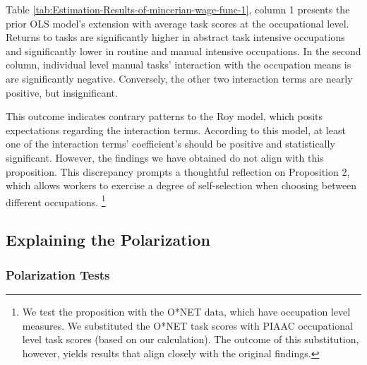 \vspace{-1cm}

\begin{onehalfspace}
Table \ref{tab:Estimation-Results-of-mincerian-wage-func-1}, column
1 presents the prior OLS model's extension with average task scores
at the occupational level. Returns to tasks are significantly higher
in abstract task intensive occupations and significantly lower in
routine and manual intensive occupations. In the second column, individual
level manual tasks' interaction with the occupation means is are significantly
negative. Conversely, the other two interaction terms are nearly positive,
but insignificant. 

This outcome indicates contrary patterns to the Roy model, which posits
expectations regarding the interaction terms. According to this model,
at least one of the interaction terms' coefficient's should be positive
and statistically significant. However, the findings we have obtained
do not align with this proposition. This discrepancy prompts a thoughtful
reflection on Proposition 2, which allows workers to exercise a degree
of self-selection when choosing between different occupations. \footnote{We test the proposition with the O{*}NET data, which have occupation
level measures. We substituted the O{*}NET task scores with PIAAC
occupational level task scores (based on our calculation). The outcome
of this substitution, however, yields results that align closely with
the original findings.}
\end{onehalfspace}

\subsection{Explaining the Polarization}

\subsubsection{Polarization Tests}

